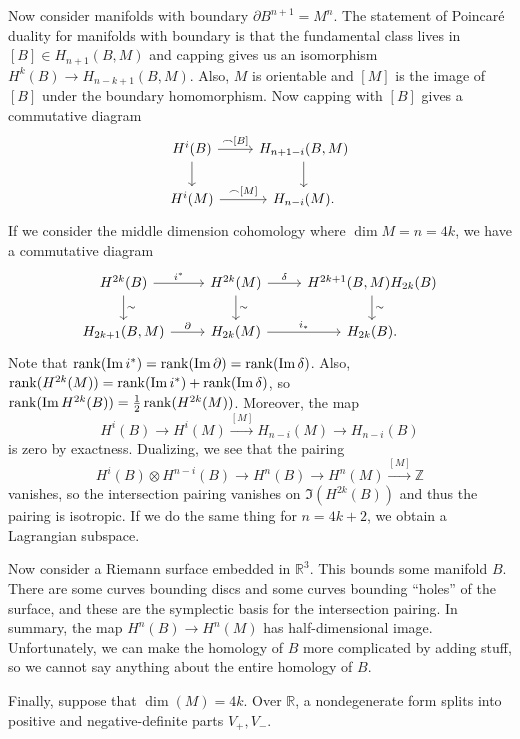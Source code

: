 \documentclass[leqno, openany]{memoir}
\theoremstyle{definition}
\theoremstyle{remark}
\theoremstyle{plain}
\theoremstyle{definition}
\theoremstyle{remark}
\newcommand{\R}{\mathbb{R}}
\newcommand{\Z}{\mathbb{Z}}
\begin{document}
Now consider manifolds with boundary $\partial B^{n+1} = M^n$. The statement of Poincar\'e duality for manifolds with boundary is that the fundamental class lives in $[B] \in H_{n+1}(B, M)$ and capping gives us an isomorphism $H^k(B) \to H_{n-k+1}(B, M)$. Also, $M$ is orientable and $[M]$ is the image of $[B]$ under the boundary homomorphism. Now capping with $[B]$ gives a commutative diagram
\begin{equation*}
\begin{tikzcd}
    H^i(B) \arrow{r}{\frown {[B]}} \arrow{d} & H_{n+1-i}(B,M) \arrow{d} \\
    H^i(M) \arrow{r}{\frown {[M]}} & H_{n-i}(M).
\end{tikzcd}
\end{equation*}
If we consider the middle dimension cohomology where $\dim M = n = 4k$, we have a commutative diagram
\begin{equation*}
\begin{tikzcd}
    H^{2k}(B) \arrow{r}{i^*} \arrow{d}{\sim} & H^{2k}(M) \arrow{d}{\sim} \arrow{r}{\delta} & H^{2k+1}(B,M) \arrow{d}{\sim} H_{2k}(B) \\
    H_{2k+1}(B,M) \arrow{r}{\partial} & H_{2k}(M) \arrow{r}{i_*} & H_{2k}(B).
\end{tikzcd}
\end{equation*}
Note that $\rank (\Im i^*) = \rank (\Im \partial) = \rank (\Im \delta)$. Also, $\rank(H^{2k}(M)) = \rank(\Im i^*) + \rank (\Im \delta)$, so $\rank (\Im H^{2k}(B)) = \frac{1}{2} \rank (H^{2k}(M))$. Moreover, the map
\[ H^i(B) \to H^i(M) \xrightarrow{{[M]}} H_{n-i}(M) \to H_{n-i}(B) \]
is zero by exactness. Dualizing, we see that the pairing
\[ H^i(B) \otimes H^{n-i}(B) \to H^n(B) \to H^n(M) \xrightarrow{{[M]}} \Z \]
vanishes, so the intersection pairing vanishes on $\Im (H^{2k}(B))$ and thus the pairing is isotropic. If we do the same thing for $n = 4k+2$, we obtain a Lagrangian subspace.

Now consider a Riemann surface embedded in $\R^3$. This bounds some manifold $B$. There are some curves bounding discs and some curves bounding ``holes'' of the surface, and these are the symplectic basis for the intersection pairing. In summary, the map $H^n(B) \to H^n(M)$ has half-dimensional image. Unfortunately, we can make the homology of $B$ more complicated by adding stuff, so we cannot say anything about the entire homology of $B$.

Finally, suppose that $\dim (M) = 4k$. Over $\R$, a nondegenerate form splits into positive and negative-definite parts $V_+, V_-$.
\end{document}
